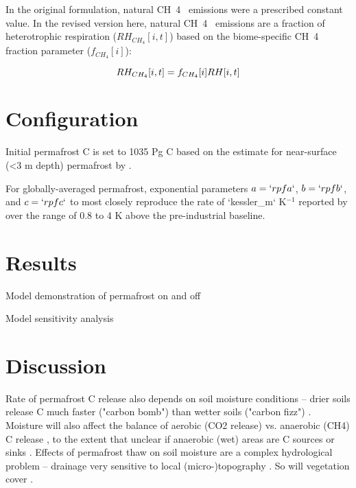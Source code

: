 \documentclass[essd, manuscript]{copernicus}
\begin{document}
In the original formulation, natural CH~4~ emissions were a prescribed constant value.
In the revised version here, natural CH~4~ emissions are a fraction of heterotrophic respiration ($RH_{CH_4}[i,t]$) based on the biome-specific CH~4~ fraction parameter ($f_{CH_4}[i]$):

\begin{equation*}
    RH_{CH_4}[i,t] = f_{CH_4}[i] RH[i,t] \\
\end{equation*}

\section{Configuration}
Initial permafrost C is set to 1035 Pg C based on the estimate for near-surface (<3 m depth) permafrost by \citet{hugelius_2014_estimated}.


For globally-averaged permafrost, exponential parameters $a = `r pfa`$, $b = `r pfb`$, and $c = `r pfc`$ to most closely reproduce the rate of `kessler_m` K$^{-1}$ reported by \citet{kessler_2017_estimating} over the range of 0.8 \footnotemark to 4 K above the pre-industrial baseline.


\section{Results}
Model demonstration of permafrost on and off

Model sensitivity analysis

\section{Discussion}
Rate of permafrost C release also depends on soil moisture conditions -- drier soils release C much faster ("carbon bomb") than wetter soils ("carbon fizz") \citep{elberling_2013_long}.
Moisture will also affect the balance of aerobic (CO2 release) vs. anaerobic (CH4) C release \citep{turetsky_2002_boreal}, to the extent that unclear if anaerobic (wet) areas are C sources or sinks \citep{wickland_2006_effects}.
Effects of permafrost thaw on soil moisture are a complex hydrological problem -- drainage very sensitive to local (micro-)topography \citep{wickland_2006_effects}.
So will vegetation cover \citep{wickland_2006_effects}.
\end{document}
